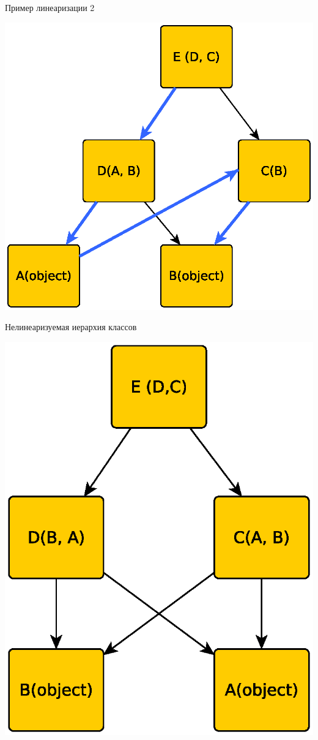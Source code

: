 \documentclass{article}
\begin{document}
\begin{center}Пример линеаризации 2\end{center}
\includegraphics{images/inheritance_2.eps}
\newpage

\begin{center}Нелинеаризуемая иерархия классов\end{center}
\includegraphics{images/linearization_fail.eps}
\newpage
\end{document}
